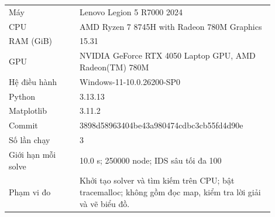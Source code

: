 \begin{tabular}{p{0.24\linewidth}p{0.66\linewidth}}
\hline
Máy & Lenovo Legion 5 R7000 2024 \\
CPU & AMD Ryzen 7 8745H with Radeon 780M Graphics \\
RAM (GiB) & 15.31 \\
GPU & NVIDIA GeForce RTX 4050 Laptop GPU, AMD Radeon(TM) 780M \\
Hệ điều hành & Windows-11-10.0.26200-SP0 \\
Python & 3.13.13 \\
Matplotlib & 3.11.2 \\
Commit & 3898d58963404be43a980474cdbc3cb55fd4d90e \\
Số lần chạy & 3 \\
Giới hạn mỗi solve & 10.0 s; 250000 node; IDS sâu tối đa 100 \\
Phạm vi đo & Khởi tạo solver và tìm kiếm trên CPU; bật tracemalloc; không gồm đọc map, kiểm tra lời giải và vẽ biểu đồ. \\
\hline
\end{tabular}
